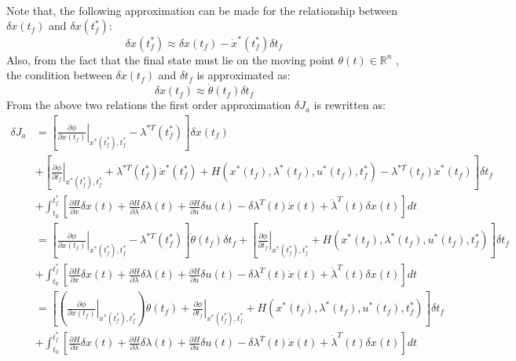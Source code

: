 \documentclass[10pt,a4paper,oneside]{article}
\begin{document}
\begin{enumerate}
\begin{align*}
\end{align*}
Note that, the following approximation can be made for the relationship between $\delta x\left(t_{f}\right)$ and $\delta x\left(t_{f}^{*}\right) :$
\[
\delta x\left(t_{f}^{*}\right) \approx \delta x\left(t_{f}\right)-\dot{x}^{*}\left(t_{f}^{*}\right) \delta t_{f}
\]
Also, from the fact that the final state must lie on the moving point $\theta(t) \in \mathbb{R}^{n}$ , the condition between $\delta x\left(t_{f}\right)$ and $\delta t_{f}$ is approximated as:
\[
\delta x\left(t_{f}\right) \approx \dot{\theta}\left(t_{f}\right) \delta t_{f}
\]
From the above two relations the first order approximation $\delta J_{a}$ is rewritten as:
\begin{align*}
\delta J_{a}&=\left[\left.\frac{\partial \phi}{\partial x\left(t_{f}\right)}\right|_{x^{*}\left(t_{f}^{*}\right), t_{f}^*}-\lambda^{* T}\left(t_{f}^{*}\right)\right] \delta x\left(t_{f}\right)\\&+\left[\left.\frac{\partial \phi}{\partial t_{f}}\right|_{x^{*}\left(t_{f}^{*}\right), t_{f}^*}+\lambda^{* T}\left(t_{f}^{*}\right) \dot{x}^{*}\left(t_{f}^{*}\right)+H\left(x^{*}\left(t_{f}\right), \lambda^{*}\left(t_{f}\right), u^{*}\left(t_{f}\right), t_{f}^{*}\right)-\lambda^{* T}\left(t_{f}\right) \dot{x}^{*}\left(t_{f}\right)\right] \delta t_{f}\\&+\int_{t_{0}}^{t_{f}^*}\left[\frac{\partial H}{\partial x} \delta x(t)+\frac{\partial H}{\partial \lambda} \delta \lambda(t)+\frac{\partial H}{\partial u} \delta u(t)-\delta \lambda^{T}(t) \dot{x}(t)+\dot{\lambda}^{T}(t) \delta x(t)\right] dt\\&=\left[\left.\frac{\partial \phi}{\partial x\left(t_{f}\right)}\right|_{x^{*}\left(t_{f}^*\right), t_{f}^*}-\lambda^{* T}\left(t_{f}^{*}\right)\right] \dot{\theta}\left(t_{f}\right) \delta t_{f}+\left[\left.\frac{\partial \phi}{\partial t_{f}}\right|_{x^{*}\left(t_{f}^{*}\right), t_{f}^*}+H\left(x^{*}\left(t_{f}\right), \lambda^{*}\left(t_{f}\right), u^{*}\left(t_{f}\right), t_{f}^{*}\right)\right] \delta t_{f}\\&+\int_{t_{0}}^{t_{f}^*}\left[\frac{\partial H}{\partial x} \delta x(t)+\frac{\partial H}{\partial \lambda} \delta \lambda(t)+\frac{\partial H}{\partial u} \delta u(t)-\delta \lambda^{T}(t) \dot{x}(t)+\dot{\lambda}^{T}(t) \delta x(t)\right] d t\\&=\left[\left(\left.\frac{\partial \phi}{\partial x\left(t_{f}\right)}\right|_{x^{*}\left(t_{f}^{*}\right), t_{f}^{*}}\right) \dot{\theta}\left(t_{f}\right)+\left.\frac{\partial \phi}{\partial t_{f}}\right|_{x^{*}\left(t_{f}^*\right), t_{f}^{*}}+H\left(x^{*}\left(t_{f}\right), \lambda^{*}\left(t_{f}\right), u^{*}\left(t_{f}\right), t_{f}^{*}\right)\right] \delta t_{f}\\&+\int_{t_{0}}^{t_{f}^*}\left[\frac{\partial H}{\partial x} \delta x(t)+\frac{\partial H}{\partial \lambda} \delta \lambda(t)+\frac{\partial H}{\partial u} \delta u(t)-\delta \lambda^{T}(t) \dot{x}(t)+\dot{\lambda}^{T}(t) \delta x(t)\right] d t

\end{align*}
\end{enumerate}
\end{document}

